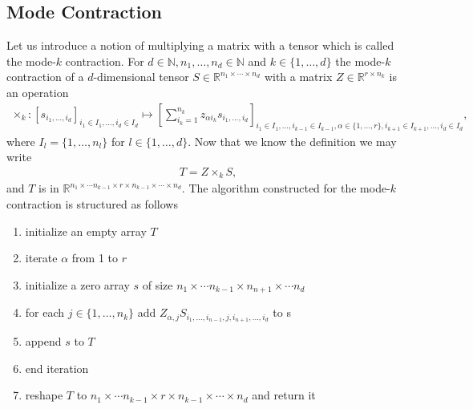\documentclass[a4paper]{article}
\begin{document}
\subsection{Mode Contraction}
Let us introduce a notion of multiplying a matrix with a tensor which is
called the mode-$k$ contraction. For $d \in \mathbb{N}, n_1,\dots, n_d \in
\mathbb{N}$ and $k\in\{1,\dots,d\}$ the mode-$k$ contraction of a
$d$-dimensional tensor $S\in\mathbb{R}^{n_1\times\cdots\times n_d}$ with a
matrix $Z \in \mathbb{R}^{r\times n_k}$ is an operation
\begin{align}
    \times_k : [s_{i_1,\dots,i_d}]_{i_1\in I_1,\dots,i_d\in I_d}\mapsto
    \left[\sum_{i_k=1}^{n_k}z_{\alpha i_k}s_{i_1,\dots,i_d}\right]_{
    i_1\in I_1, \dots, i_{k-1}\in I_{k-1}, \alpha\in\{1,\dots,r\},
i_{k+1}\in I_{k+1}, \dots, i_d \in I_d},
\end{align}
where $I_l = \{1, \dots, n_l\}$ for $l \in \{1,\dots, d\}$. Now that we know
the definition we may write
\begin{align}
        T = Z \times_k S,
\end{align}
and $T$ is in $\mathbb{R}^{n_1\times \cdots n_{k-1} \times r\times n_{k-1}
\times \cdots \times n_d}$. The algorithm constructed for the mode-$k$
contraction is structured as follows
\begin{enumerate}
    \item initialize an empty array $T$
    \item iterate $\alpha$ from 1 to $r$
    \item initialize a zero array $s$ of size $n_1\times\cdots
        n_{k-1}\times n_{n+1} \times \cdots n_d$
    \item for each $j \in \{1, \dots , n_k\}$ add $Z_{\alpha, j}S_{i_1,
        \dots, i_{n-1}, j, i_{n+1}, \dots ,i_d}$ to s
    \item append $s$ to $T$
        \item end iteration
    \item reshape $T$ to $n_1\times \cdots n_{k-1} \times r\times n_{k-1}
        \times \cdots \times n_d$ and return it
\end{enumerate}
\end{document}
